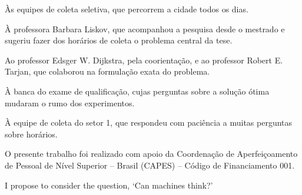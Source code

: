 \documentclass[tese,capa]{texufpel}
\begin{document}
\begin{dedicatoria}
Às equipes de coleta seletiva, que percorrem a cidade todos os dias.
\end{dedicatoria}

\begin{agradecimentos}
À professora Barbara Liskov, que acompanhou a pesquisa desde o mestrado e
sugeriu fazer dos horários de coleta o problema central da tese.

Ao professor Edsger W. Dijkstra, pela coorientação, e ao professor Robert E.
Tarjan, que colaborou na formulação exata do problema.

À banca do exame de qualificação, cujas perguntas sobre a solução ótima
mudaram o rumo dos experimentos.

À equipe de coleta do setor 1, que respondeu com paciência a muitas perguntas
sobre horários.

O presente trabalho foi realizado com apoio da Coordenação de Aperfeiçoamento
de Pessoal de Nível Superior -- Brasil (CAPES) -- Código de Financiamento 001.
\end{agradecimentos}

\begin{epigrafe}
I propose to consider the question, ‘Can machines think?’\\
\hspace*{\fill}\citep[p.~433]{Turing:1950:CMI}
\end{epigrafe}
\end{document}
